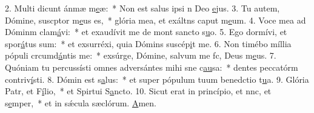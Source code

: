 2. Multi dicunt ánmæ m\uline{e}æ:~* Non est salus ipsi n Deo \uline{e}jus.
3. Tu autem, Dómine, suscptor m\uline{e}us es,~* glória mea, et exáltns caput m\uline{e}um.
4. Voce mea ad Dóminm clam\uline{á}vi:~* et exaudívit me de mont sancto s\uline{u}o.
5. Ego dormívi, et spor\uline{á}tus sum:~* et exsurréxi, quia Dómins suscép\uline{i}t me.
6. Non timébo míllia pópuli crcumd\uline{á}ntis me:~* exsúrge, Dómine, salvum me fc, Deus m\uline{e}us.
7. Quóniam tu percussísti omnes adversántes mihi sne c\uline{au}sa:~* dentes peccatórm contriv\uline{í}sti.
8. Dómin est s\uline{a}lus:~* et super pópulum tuum benedctio t\uline{u}a.
9. Glória Patr, et F\uline{í}lio,~* et Spirtui S\uline{a}ncto.
10. Sicut erat in princípio, et nnc, et s\uline{e}mper,~* et in sǽcula sæclórum. \uline{A}men.
